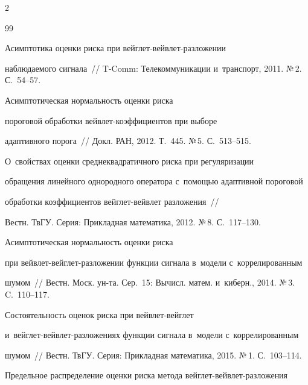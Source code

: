\begin{multicols}{2}
{{\begin{thebibliography}{99}

 Асимптотика оценки риска при вейг\-лет-вейв\-лет-раз\-ло\-же\-нии 

наблюдаемого сигнала~// T-Comm: Телекоммуникации и~транспорт, 2011. №\,2. С.~54--57.








  Асимптотическая нормальность оценки риска 

пороговой обработки вейв\-лет-ко\-эф\-фи\-ци\-ен\-тов при выборе

адаптивного порога~// Докл. РАН, 2012. Т.~445. №\,5. С.~513--515.




 О~свойствах оценки среднеквадратичного риска при регуляризации 

обращения линейного однородного оператора с~помощью адаптивной пороговой 

обработки коэффициентов вейг\-лет-вейв\-лет раз\-ло\-же\-ния~// 

Вестн. ТвГУ. Серия: Прикладная математика, 2012. №\,8. С.~117--130.




 Асимптотическая нормальность оценки риска 

при вейв\-лет-вейг\-лет-раз\-ло\-же\-нии функции сигнала в~модели с~коррелированным 

шумом~// Вестн. Моск. ун-та. Сер.~15: Вычисл. матем. и~киберн., 2014. №\,3. C.~110--117.




 Состоятельность оценок риска при вейв\-лет-вейг\-лет 

и~вейг\-лет-вейв\-лет-раз\-ло\-же\-ни\-ях функции сигнала в~модели с~коррелированным 

шумом~// Вестн. ТвГУ. Серия: Прикладная математика, 2015. №\,1. С.~103--114.





Предельное распределение оценки риска метода вейг\-лет-вейв\-лет-раз\-ло\-же\-ния 


\end{thebibliography}}}
\end{multicols}
